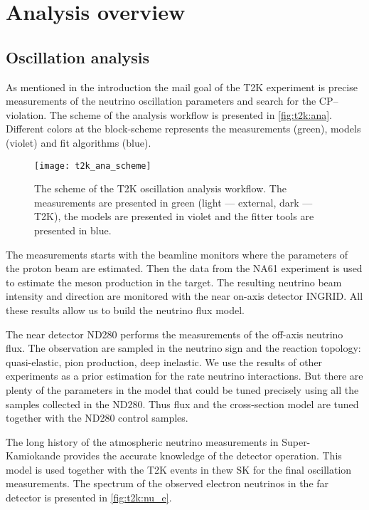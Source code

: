 \documentclass[../main.tex]{subfiles}
\begin{document}
\section{Analysis overview}
\subsection{Oscillation analysis}
As mentioned in the introduction the mail goal of the T2K experiment is precise measurements of the neutrino oscillation parameters and search for the CP--violation. The scheme of the analysis workflow is presented in \autoref{fig:t2k:ana}. Different colors at the block-scheme represents the measurements (green), models (violet) and fit algorithms (blue).

\begin{figure}[ht!]
  \centering
  \texttt{[image: t2k\_ana\_scheme]}
  \caption{The scheme of the T2K oscillation analysis workflow. The measurements are presented in green (light --- external, dark --- T2K), the models are presented in violet and the fitter tools are presented in blue.}
  \label{fig:t2k:ana}
\end{figure}

The measurements starts with the beamline monitors where the parameters of the proton beam are estimated. Then the data from the NA61 experiment is used to estimate the meson production in the target. The resulting neutrino beam intensity and direction are monitored with the near on-axis detector INGRID. All these results allow us to build the neutrino flux model.

The near detector ND280 performs the measurements of the off-axis neutrino flux. The observation are sampled in the neutrino sign and the reaction topology: quasi-elastic, pion production, deep inelastic. We use the results of other experiments as a prior estimation for the rate neutrino interactions. But there are plenty of the parameters in the model that could be tuned precisely using all the samples collected in the ND280. Thus flux and the cross-section model are tuned together with the ND280 control samples.

The long history of the atmospheric neutrino measurements in Super-Kamiokande provides the accurate knowledge of the detector operation. This model is used together with the T2K events in thew SK for the final oscillation measurements. The spectrum of the observed electron neutrinos in the far detector is presented in \autoref{fig:t2k:nu_e}.
\end{document}
